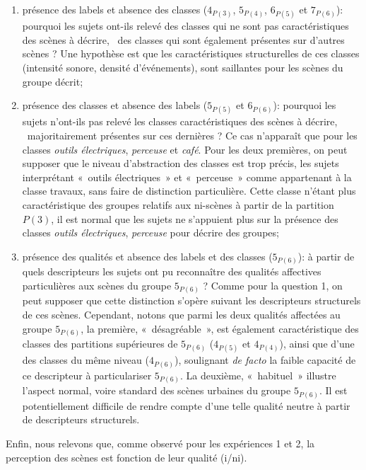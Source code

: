 \begin{enumerate} 
\item présence des labels et absence des classes ($4_{P(3)}$, $5_{P(4)}$, $6_{P(5)}$ et $7_{P(6)}$): pourquoi les sujets ont-ils relevé des classes qui ne sont pas caractéristiques des scènes à décrire, \ie~des classes qui sont également présentes sur d'autres scènes ? Une hypothèse est que les caractéristiques structurelles de ces classes (intensité sonore, densité d'événements), sont saillantes pour les scènes du groupe décrit;
\item présence des classes et absence des labels ($5_{P(5)}$ et $6_{P(6)}$): pourquoi les sujets n'ont-ils pas relevé les classes caractéristiques des scènes à décrire, \ie~majoritairement présentes sur ces dernières ? Ce cas n’apparaît que pour les classes \emph{outils électriques}, \emph{perceuse} et  \emph{café}. Pour les deux premières, on peut supposer que le niveau d'abstraction des classes est trop précis, les sujets interprétant «~outils électriques~» et «~perceuse~» comme appartenant à la classe travaux, sans faire de distinction particulière. Cette classe n'étant plus caractéristique des groupes relatifs aux ni-scènes à partir de la partition $P(3)$, il est normal que les sujets ne s'appuient plus sur la présence des classes \emph{outils électriques}, \emph{perceuse} pour décrire des groupes;
\item présence des qualités et absence des labels et des classes ($5_{P(6)}$): à partir de quels descripteurs les sujets ont pu reconnaître des qualités affectives particulières aux scènes du groupe $5_{P(6)}$ ? Comme pour la question 1, on peut supposer que cette distinction s'opère suivant les descripteurs structurels de ces scènes. Cependant, notons que parmi les deux qualités affectées au groupe $5_{P(6)}$, la première, «~désagréable~», est également caractéristique des classes des partitions supérieures de $5_{P(6)}$ ($4_{P(5)}$ et $4_{P(4)}$), ainsi que d'une des classes du même niveau ($4_{P(6)}$), soulignant \emph{de facto} la faible capacité de ce descripteur à particulariser $5_{P(6)}$. La deuxième, «~habituel~» illustre l'aspect normal, voire standard des scènes urbaines du groupe $5_{P(6)}$. Il est potentiellement difficile de rendre compte d'une telle qualité neutre à partir de descripteurs structurels.
\end{enumerate}

Enfin, nous relevons que, comme observé pour les expériences 1 et 2, la perception des scènes est fonction de leur qualité (i/ni).

